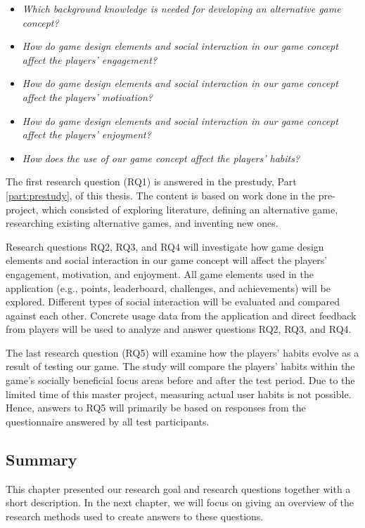 \vspace{0.6\baselineskip}
\begin{itemize}[align=parleft, leftmargin=4em, style=nextline]
    \item[\textbf{RQ1}:] \textit{Which background knowledge is needed for developing an alternative game concept?}
    \item[\textbf{RQ2}:] \textit{How do game design elements and social interaction in our game concept affect the players’ engagement?}
    \item[\textbf{RQ3}:] \textit{How do game design elements and social interaction in our game concept affect the players’ motivation?}
    \clearpage
    \item[\textbf{RQ4}:] \textit{How do game design elements and social interaction in our game concept affect the players’ enjoyment?}
    \item[\textbf{RQ5}:] \textit{How does the use of our game concept affect the players’ habits?}
\end{itemize}
The first research question (RQ1) is answered in the prestudy, Part \ref{part:prestudy}, of this thesis. The content is based on work done in the pre-project, which consisted of exploring literature, defining an alternative game, researching existing alternative games, and inventing new ones.

Research questions RQ2, RQ3, and RQ4 will investigate how game design elements and social interaction in our game concept will affect the players’ engagement, motivation, and enjoyment. All game elements used in the application (e.g., points, leaderboard, challenges, and achievements) will be explored. Different types of social interaction will be evaluated and compared against each other. Concrete usage data from the application and direct feedback from players will be used to analyze and answer questions RQ2, RQ3, and RQ4.

The last research question (RQ5) will examine how the players’ habits evolve as a result of testing our game. The study will compare the players’ habits within the game’s socially beneficial focus areas before and after the test period. Due to the limited time of this master project, measuring actual user habits is not possible. Hence, answers to RQ5 will primarily be based on responses from the questionnaire answered by all test participants.

\subsection{Summary}
This chapter presented our research goal and research questions together with a short description. In the next chapter, we will focus on giving an overview of the research methods used to create answers to these questions.
